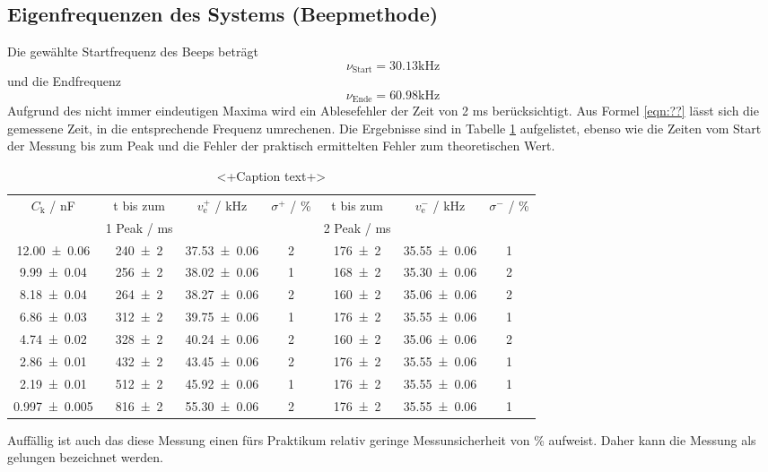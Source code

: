 \subsection{Eigenfrequenzen des Systems (Beepmethode)}
Die gewählte Startfrequenz des Beeps beträgt
\begin{equation}
  \nu_\text{Start} = 30.13 \text{kHz}
\end{equation}
und die Endfrequenz
\begin{equation}
  \nu_\text{Ende} = 60.98 \text{kHz}
\end{equation}
Aufgrund des nicht immer eindeutigen Maxima wird ein Ablesefehler der Zeit von 2 ms berücksichtigt. Aus Formel \ref{eqn:??} lässt sich die gemessene Zeit, in die entsprechende Frequenz umrechenen. Die Ergebnisse sind in Tabelle \ref{tab:beep} aufgelistet, ebenso wie die Zeiten vom Start der Messung bis zum Peak und die Fehler der praktisch ermittelten Fehler zum theoretischen Wert.
\begin{table}
  \centering
  \begin{tabular}{c c c c c c c}
    \toprule
    $C_\text{k}$ / nF & t bis zum & $v_\text{e}^+$ / kHz & $\sigma^+$ / \% & t bis zum & $v_\text{e}^-$ / kHz & $\sigma^-$ / \%  \\
    &1 Peak / ms& & & 2 Peak / ms & & \\
    \midrule
    \num{12.00 +- 0.06}     & \num{240 +- 2} &\num{37.53 +- 0.06} & 2 & \num{176 +- 2} & \num{35.55 +- 0.06} & 1 \\
    \num{9.99 +- 0.04}      & \num{256 +- 2} &\num{38.02 +- 0.06} & 1 & \num{168 +- 2} & \num{35.30 +- 0.06} & 2 \\
    \num{8.18 +- 0.04}      & \num{264 +- 2} &\num{38.27 +- 0.06} & 2 & \num{160 +- 2} & \num{35.06 +- 0.06} & 2 \\
    \num{6.86 +- 0.03}      & \num{312 +- 2} &\num{39.75 +- 0.06} & 1 & \num{176 +- 2} & \num{35.55 +- 0.06} & 1 \\
    \num{4.74 +- 0.02}      & \num{328 +- 2} &\num{40.24 +- 0.06} & 2 & \num{160 +- 2} & \num{35.06 +- 0.06} & 2 \\
    \num{2.86 +- 0.01}      & \num{432 +- 2} &\num{43.45 +- 0.06} & 2 & \num{176 +- 2} & \num{35.55 +- 0.06} & 1 \\
    \num{2.19 +- 0.01}      & \num{512 +- 2} &\num{45.92 +- 0.06} & 1 & \num{176 +- 2} & \num{35.55 +- 0.06} & 1 \\
    \num{0.997 +- 0.005}    & \num{816 +- 2} &\num{55.30 +- 0.06} & 2 & \num{176 +- 2} & \num{35.55 +- 0.06} & 1 \\
    \bottomrule
  \end{tabular}
  \caption{<+Caption text+>}
  \label{tab:beep}
\end{table}
Auffällig ist auch das diese Messung einen fürs Praktikum relativ geringe Messunsicherheit von  \% aufweist. Daher kann die Messung als gelungen bezeichnet werden.
